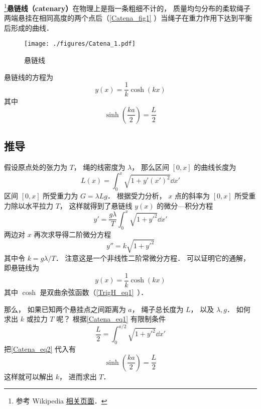 
\footnote{参考 Wikipedia \href{https://en.wikipedia.org/wiki/Catenary}{相关页面}．}\textbf{悬链线（catenary）}在物理上是指一条粗细不计的， 质量均匀分布的柔软绳子两端悬挂在相同高度的两个点后（\autoref{Catena_fig1} ）当绳子在重力作用下达到平衡后形成的曲线．

\begin{figure}[ht]
\centering
\texttt{[image: ./figures/Catena\_1.pdf]}
\caption{悬链线} \label{Catena_fig1}
\end{figure}
悬链线的方程为
\begin{equation}
y(x) = \frac{1}{k}\cosh(kx)
\end{equation}
其中
\begin{equation}
\sinh(\frac{ka}{2}) = \frac{L}{2}
\end{equation}

\subsection{推导}
假设原点处的张力为 $T$， 绳的线密度为 $\lambda$， 那么区间 $[0, x]$ 的曲线长度为
\begin{equation}\label{Catena_eq1}
L(x) = \int_0^x \sqrt{1 + y'(x')^2} \dd{x'}
\end{equation}
区间 $[0, x]$ 所受重力为 $G = \lambda L g$． 根据受力分析， $x$ 点的斜率为 $[0, x]$ 所受重力除以水平拉力 $T$， 这样就得到了悬链线 $y(x)$ 的微分—积分方程
\begin{equation}
y' = \frac{g\lambda}{T} \int_0^x \sqrt{1 + y'^2} \dd{x'}
\end{equation}
两边对 $x$ 再次求导得二阶微分方程
\begin{equation}
y'' = k \sqrt{1 + y'^2}
\end{equation}
其中令 $k = g\lambda/T$． 注意这是一个非线性二阶常微分方程． 可以证明它的通解， 即悬链线为
\begin{equation}\label{Catena_eq2}
y(x) = \frac{1}{k}\cosh(kx)
\end{equation}
其中 $\cosh$ 是双曲余弦函数（\autoref{TrigH_eq1}~）．

那么， 如果已知两个悬挂点之间距离为 $a$， 绳子总长度为 $L$， 以及 $\lambda, g$． 如何求出 $k$ 或拉力 $T$ 呢？ 根据\autoref{Catena_eq1} 有限制条件
\begin{equation}
\frac{L}{2} = \int_0^{a/2} \sqrt{1 + y'^2} \dd{x'}
\end{equation}
把\autoref{Catena_eq2} 代入有
\begin{equation}
\sinh(\frac{ka}{2}) = \frac{L}{2}
\end{equation}
这样就可以解出 $k$， 进而求出 $T$．
